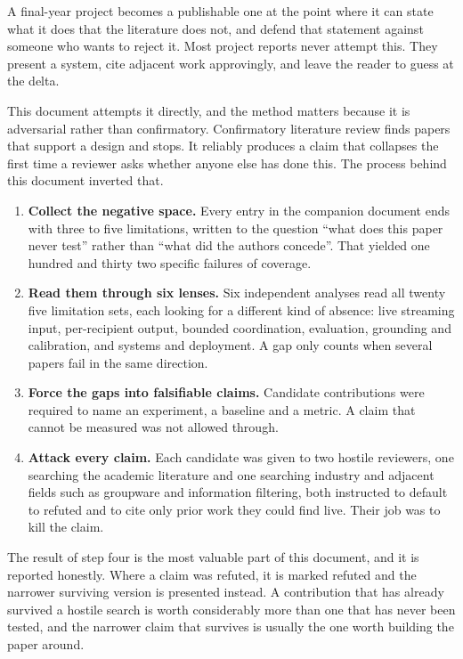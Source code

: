 A final-year project becomes a publishable one at the point where it can state
what it does that the literature does not, and defend that statement against
someone who wants to reject it. Most project reports never attempt this. They
present a system, cite adjacent work approvingly, and leave the reader to
guess at the delta.

This document attempts it directly, and the method matters because it is
adversarial rather than confirmatory. Confirmatory literature review finds
papers that support a design and stops. It reliably produces a claim that
collapses the first time a reviewer asks whether anyone else has done this.
The process behind this document inverted that.

\begin{enumerate}
\item \textbf{Collect the negative space.} Every entry in the companion
document ends with three to five limitations, written to the question ``what
does this paper never test'' rather than ``what did the authors concede''.
That yielded one hundred and thirty two specific failures of coverage.

\item \textbf{Read them through six lenses.} Six independent analyses read all
twenty five limitation sets, each looking for a different kind of absence:
live streaming input, per-recipient output, bounded coordination, evaluation,
grounding and calibration, and systems and deployment. A gap only counts when
several papers fail in the same direction.

\item \textbf{Force the gaps into falsifiable claims.} Candidate contributions
were required to name an experiment, a baseline and a metric. A claim that
cannot be measured was not allowed through.

\item \textbf{Attack every claim.} Each candidate was given to two hostile
reviewers, one searching the academic literature and one searching industry
and adjacent fields such as groupware and information filtering, both
instructed to default to refuted and to cite only prior work they could find
live. Their job was to kill the claim.
\end{enumerate}

The result of step four is the most valuable part of this document, and it is
reported honestly. Where a claim was refuted, it is marked refuted and the
narrower surviving version is presented instead. A contribution that has
already survived a hostile search is worth considerably more than one that has
never been tested, and the narrower claim that survives is usually the one
worth building the paper around.

